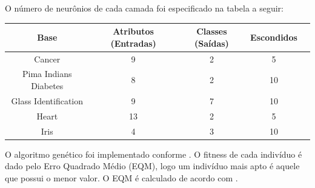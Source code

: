 \documentclass[12pt]{article}
\begin{document}
\par O número de neurônios de cada camada foi especificado na tabela a seguir:


\begin{tabular}{|c|c|c|c|c|}
\hline Base  & Atributos (Entradas) & Classes (Saídas) & Escondidos \\ 
\hline Cancer & 9 & 2 & 5 \\ 
\hline Pima Indians Diabetes & 8 & 2 & 10 \\ 
\hline Glass Identification & 9 & 7 & 10 \\ 
\hline Heart & 13 & 2 & 5 \\ 
\hline Iris & 4 & 3 & 10 \\ 
\hline 
\end{tabular} 

\par O algoritmo genético foi implementado conforme \cite{essentials}. O fitness de cada indivíduo é dado pelo Erro Quadrado Médio (EQM), logo um indivíduo mais apto é aquele que possui o menor valor. O EQM é calculado de acordo com \cite{Liu}.
\end{document}
